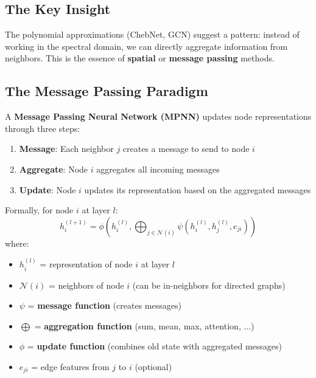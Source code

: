 \begin{notechapter}
\subsection{The Key Insight}

The polynomial approximations (ChebNet, GCN) suggest a pattern: instead 
of working in the spectral domain, we can directly aggregate information 
from neighbors. This is the essence of \textbf{spatial} or 
\textbf{message passing} methods.

\begin{center}
\end{center}

\subsection{The Message Passing Paradigm}

\begin{definition}
A \textbf{Message Passing Neural Network (MPNN)} updates node 
representations through three steps:

\begin{enumerate}
    \item \textbf{Message}: Each neighbor $j$ creates a message to send 
          to node $i$
    \item \textbf{Aggregate}: Node $i$ aggregates all incoming messages
    \item \textbf{Update}: Node $i$ updates its representation based on 
          the aggregated messages
\end{enumerate}

Formally, for node $i$ at layer $l$:
\begin{equation}
\boxed{
h_i^{(l+1)} = \phi\left( h_i^{(l)}, 
    \bigoplus_{j \in \mathcal{N}(i)} \psi(h_i^{(l)}, h_j^{(l)}, e_{ji}) 
    \right)
}
\end{equation}
where:
\begin{itemize}
    \item $h_i^{(l)}$ = representation of node $i$ at layer $l$
    \item $\mathcal{N}(i)$ = neighbors of node $i$ (can be in-neighbors 
          for directed graphs)
    \item $\psi$ = \textbf{message function} (creates messages)
    \item $\bigoplus$ = \textbf{aggregation function} (sum, mean, max, 
          attention, ...)
    \item $\phi$ = \textbf{update function} (combines old state with 
          aggregated messages)
    \item $e_{ji}$ = edge features from $j$ to $i$ (optional)
\end{itemize}
\end{definition}


\end{notechapter}
